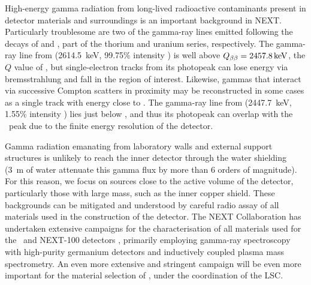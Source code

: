 High-energy gamma radiation from long-lived radioactive contaminants present in detector materials and surroundings is an important background in NEXT. Particularly troublesome are two of the gamma-ray lines emitted following the decays of  and , part of the thorium and uranium series, respectively. The gamma-ray line from  (2614.5~keV, 99.75\% intensity \cite{nudat}) is well above $\Qbb=\SI{2457.8}{\kilo\eV}$, the $Q$ value of , but single-electron tracks from its photopeak can lose energy via bremsstrahlung and fall in the region of interest. Likewise, gammas that interact via successive Compton scatters in proximity may be reconstructed in some cases as a single track with energy close to \Qbb. The gamma-ray line from  (2447.7~keV, 1.55\% intensity \cite{nudat}) lies just below \Qbb, and thus its photopeak can overlap with the \bbonu\ peak due to the finite energy resolution of the detector.


Gamma radiation emanating from laboratory walls and external support structures is unlikely to reach the inner detector through the water shielding (3~m of water attenuate this gamma flux by more than 6 orders of magnitude). For this reason, we focus on sources close to the active volume of the detector, particularly those with large mass, such as the inner copper shield. These backgrounds can be mitigated and understood by careful radio assay of all materials used in the construction of the detector. The NEXT Collaboration has undertaken extensive campaigns for the characterisation of all materials used for the \NEW\ and NEXT-100 detectors \cite{Alvarez:2012as, Cebrian:2017jzb}, primarily employing gamma-ray spectroscopy with high-purity germanium detectors and inductively coupled plasma mass spectrometry. An even more extensive and stringent campaign will be even more important for the material selection of \NHD, under the coordination of the LSC.  



